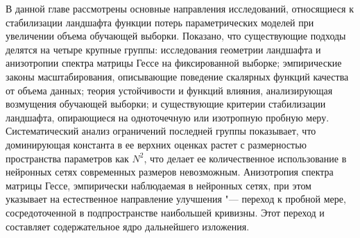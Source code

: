 В данной главе рассмотрены основные направления исследований, относящиеся к стабилизации ландшафта функции потерь параметрических моделей при увеличении объема обучающей выборки. Показано, что существующие подходы делятся на четыре крупные группы: исследования геометрии ландшафта и анизотропии спектра матрицы Гессе на фиксированной выборке; эмпирические законы масштабирования, описывающие поведение скалярных функций качества от объема данных; теория устойчивости и функций влияния, анализирующая возмущения обучающей выборки; и существующие критерии стабилизации ландшафта, опирающиеся на одноточечную или изотропную пробную меру. Систематический анализ ограничений последней группы показывает, что доминирующая константа в ее верхних оценках растет с размерностью пространства параметров как $N^2$, что делает ее количественное использование в нейронных сетях современных размеров невозможным. Анизотропия спектра матрицы Гессе, эмпирически наблюдаемая в нейронных сетях, при этом указывает на естественное направление улучшения "--- переход к пробной мере, сосредоточенной в подпространстве наибольшей кривизны. Этот переход и составляет содержательное ядро дальнейшего изложения.
